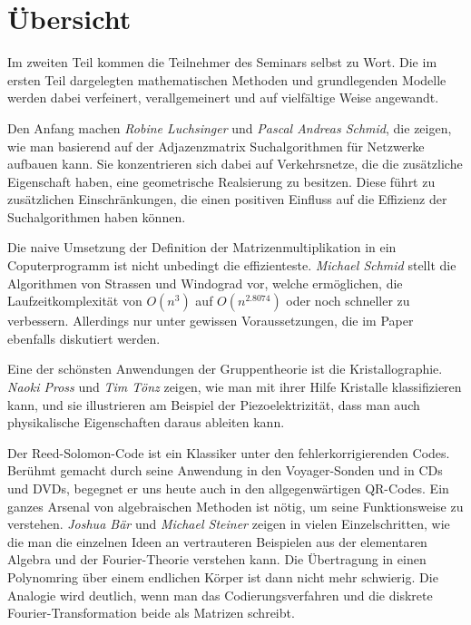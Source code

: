 %
%
%
\chapter*{Übersicht}
\rhead{}
\label{buch:uebersicht}
Im zweiten Teil kommen die Teilnehmer des Seminars selbst zu Wort.
Die im ersten Teil dargelegten mathematischen Methoden und
grundlegenden Modelle werden dabei verfeinert, verallgemeinert
und auf vielfältige Weise angewandt.

Den Anfang machen {\em Robine Luchsinger} und {\em Pascal Andreas Schmid},
die zeigen, wie man basierend auf der Adjazenzmatrix Suchalgorithmen
für Netzwerke aufbauen kann.
Sie konzentrieren sich dabei auf Verkehrsnetze, die die zusätzliche
Eigenschaft haben, eine geometrische Realsierung zu besitzen.
Diese führt zu zusätzlichen Einschränkungen, die einen positiven
Einfluss auf die Effizienz der Suchalgorithmen haben können.

Die naive Umsetzung der Definition der Matrizenmultiplikation in
ein Coputerprogramm ist nicht unbedingt die effizienteste.
{\em Michael Schmid} stellt die Algorithmen von Strassen und
Windograd vor, welche ermöglichen, die Laufzeitkomplexität
von $O(n^3)$ auf $O(n^{2.8074})$ oder noch schneller zu verbessern.
Allerdings nur unter gewissen Voraussetzungen, die im Paper
ebenfalls diskutiert werden.

Eine der schönsten Anwendungen der Gruppentheorie ist die
Kristallographie.
{\em Naoki Pross} und {\em Tim Tönz} zeigen, wie man mit ihrer
Hilfe Kristalle klassifizieren kann, und sie illustrieren am Beispiel
der Piezoelektrizität, dass man auch physikalische Eigenschaften daraus
ableiten kann.

Der Reed-Solomon-Code ist ein Klassiker unter den fehlerkorrigierenden
Codes.
Berühmt gemacht durch seine Anwendung in den Voyager-Sonden und in CDs
und DVDs, begegnet er uns heute auch in den allgegenwärtigen QR-Codes.
Ein ganzes Arsenal von algebraischen Methoden ist nötig, um seine
Funktionsweise zu verstehen.
{\em Joshua Bär} und {\em Michael Steiner} zeigen in vielen Einzelschritten,
wie die man die einzelnen Ideen an vertrauteren Beispielen aus der
elementaren Algebra und der Fourier-Theorie verstehen kann.
Die Übertragung in einen Polynomring über einem endlichen Körper 
ist dann nicht mehr schwierig.
Die Analogie wird deutlich, wenn man das Codierungsverfahren und
die diskrete Fourier-Transformation beide als Matrizen schreibt.

